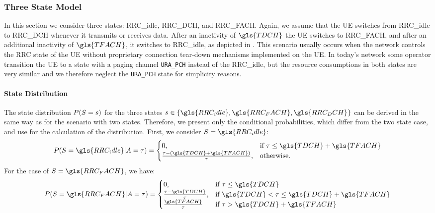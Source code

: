 \subsubsection*{Three State Model}\label{sec:network:performance_model:analytical_model:three_states}
In this section we consider three states: \gls{RRC_idle}, \gls{RRC_DCH}, and \gls{RRC_FACH}.
Again, we assume that the \gls{UE} switches from \gls{RRC_idle} to \gls{RRC_DCH} whenever it transmits or receives data.
After an inactivity of \(\gls{TDCH}\) the \gls{UE} switches to \gls{RRC_FACH}, and after an additional inactivity of \(\gls{TFACH}\), it switches to \gls{RRC_idle}, as depicted in .
This scenario usually occurs when the network controls the \gls{RRC} state of the \gls{UE} without proprietary connection tear-down mechanisms implemented on the \gls{UE}.
In today's network some operator transition the \gls{UE} to a state with a paging channel \texttt{URA\_PCH} instead of the \gls{RRC_idle}, but the resource consumptions in both states are very similar and we therefore neglect the \texttt{URA\_PCH} state for simplicity reasons.

\paragraph*{State Distribution}
The state distribution \(P(S=s)\) for the three states \(\RRCStateRealization\in\{\gls{RRC_idle},\gls{RRC_FACH},\gls{RRC_DCH}\}\) can be derived in the same way as for the scenario with two states.
Therefore, we present only the conditional probabilities, which differ from the two state case, and use  for the calculation of the distribution.
First, we consider \(\RRCState=\gls{RRC_idle}\): 
\begin{equation*} 
P(\RRCState=\gls{RRC_idle} \vert \PacketIAT = \ObservationIntervalLength) =
\begin{cases} 
	0,  & \mbox{if } \ObservationIntervalLength \leq \gls{TDCH}+\gls{TFACH} \\ 
	\frac{\ObservationIntervalLength - (\gls{TDCH}+\gls{TFACH})}{\ObservationIntervalLength}, 
	    & \mbox{otherwise.}
\end{cases}
\end{equation*}
For the case of \(\RRCState=\gls{RRC_FACH}\), we have:
\begin{equation*} 
P(\RRCState=\gls{RRC_FACH} \vert \PacketIAT = \ObservationIntervalLength) =
\begin{cases} 
	0,  & \mbox{if } \ObservationIntervalLength \leq \gls{TDCH} \\ 
	\frac{\ObservationIntervalLength - \gls{TDCH}}{\ObservationIntervalLength}, 
	    & \mbox{if }\gls{TDCH}<\ObservationIntervalLength\leq \gls{TDCH}+\gls{TFACH} \\
	\frac{\gls{TFACH}}{\ObservationIntervalLength} 
	    & \mbox{if } \ObservationIntervalLength > \gls{TDCH}+\gls{TFACH} 
\end{cases}
\end{equation*}

